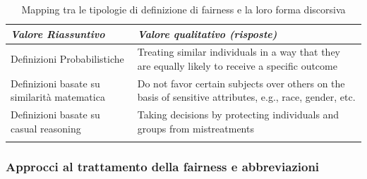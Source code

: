      \begin{longtable}{| p{} | p{} |} 
      
      \hline\textbf{\textit{Valore Riassuntivo}} & \textbf{\textit{Valore qualitativo (risposte)}}
       
        
        \\ \hline
        \rowcolor{Gray}
        Definizioni Probabilistiche        
        
        &   Treating similar individuals in a way that they are equally likely to receive a specific outcome

        
        \\ \hline


        Definizioni basate su similarità matematica      
        
        &  Do not favor certain subjects over others on the basis of sensitive attributes, e.g., race, gender, etc.




        \\ \hline
        \rowcolor{Gray}
        Definizioni basate su casual reasoning       
        
        &  Taking decisions by protecting individuals and groups from mistreatments

        
        \\ \hline
        \caption{Mapping tra le tipologie di definizione di fairness e la loro forma discorsiva} %
        \label{tab:myfirstlongtable}
    \end{longtable}
    
    
     \subsubsection{Approcci al trattamento della fairness e abbreviazioni}
    
    \begin{center}
		\hspace*{-5mm}%
	\end{center}
	
